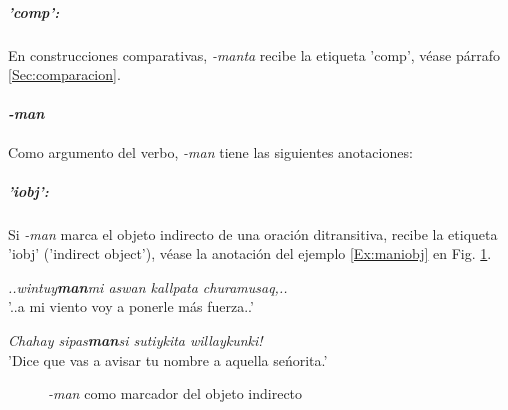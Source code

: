 \documentclass[a4paper,11pt,DIV12]{scrartcl}
\begin{document}
\subparagraph{'comp':}
En construcciones comparativas, {\em -manta} recibe la etiqueta 'comp', v\'ease p\'arrafo \ref{Sec:comparacion}.

\paragraph{{\em -man}} Como argumento del verbo, {\em -man} tiene las siguientes anotaciones:\\

\subparagraph{'iobj':}
 Si {\em -man} marca el objeto indirecto de una oraci\'on ditransitiva, recibe la etiqueta 'iobj' ('indirect object'), v\'ease la anotaci\'on del ejemplo \ref{Ex:maniobj} en Fig. \ref{Fig:maniobj}.

\begin{examples}
 \item\label{Ex:maniobj} \textit{..wintuy\textbf{man}mi aswan kallpata churamusaq,..}\\
	'..a mi viento voy a ponerle más fuerza..'\\
 \hfill {\small \citep{Valderrama77}}
 \item {\em Chahay sipas\textbf{man}si sutiykita willaykunki!}\\
      'Dice que vas a avisar tu nombre a aquella se\'norita.'\\
        	 \hfill{\small \citep[123]{Cusi2}}
\end{examples}


\begin{figure}
 \begin{center}
\end{center}
\caption{{\em -man} como marcador del objeto indirecto}\label{Fig:maniobj}
\end{figure}
\end{document}

